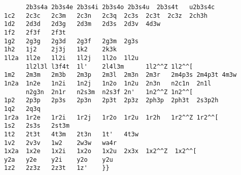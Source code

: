 \begin{verbatim}
      2b3s4a 2b3s4e 2b3s4i 2b3s4o 2b3s4u  2b3s4t   u2b3s4c
1c2   2c3c   2c3m   2c3n   2c3q  2c3s  2c3t  2c3z  2ch3h
1d2   2d3d   2d3g   2d3m   2d3s  2d3v  4d3w
1f2   2f3f   2f3t
1g2   2g3g   2g3d   2g3f   2g3m  2g3s
1h2   1j2    2j3j   1k2    2k3k
1l2a  1l2e   1l2i   1l2j   1l2o  1l2u
      1l2l3l l3f4t  1l'    2l4l3m      1l2^^Z 1l2^^[
1m2   2m3m   2m3b   2m3p   2m3l  2m3n  2m3r   2m4p3s 2m4p3t 4m3w
1n2a  1n2e   1n2i   1n2j   1n2o  1n2u  2n3n   n2c1n  2n1l
      n2g3n  2n1r   n2s3m  n2s3f 2n'   1n2^^Z 1n2^^[
1p2   2p3p   2p3s   2p3n   2p3t  2p3z  2ph3p  2ph3t  2s3p2h
1q2   2q3q
1r2a  1r2e   1r2i   1r2j   1r2o  1r2u  1r2h   1r2^^Z 1r2^^[
1s2   2s3s   2st3m
1t2   2t3t   4t3m   2t3n   1t'   4t3w
1v2   2v3v   1w2    2w3w   wa4r
1x2a  1x2e   1x2i   1x2o   1x2u  2x3x  1x2^^Z  1x2^^[
y2a   y2e    y2i    y2o    y2u
1z2   2z3z   2z3t   1z'    }}
\end{verbatim}


